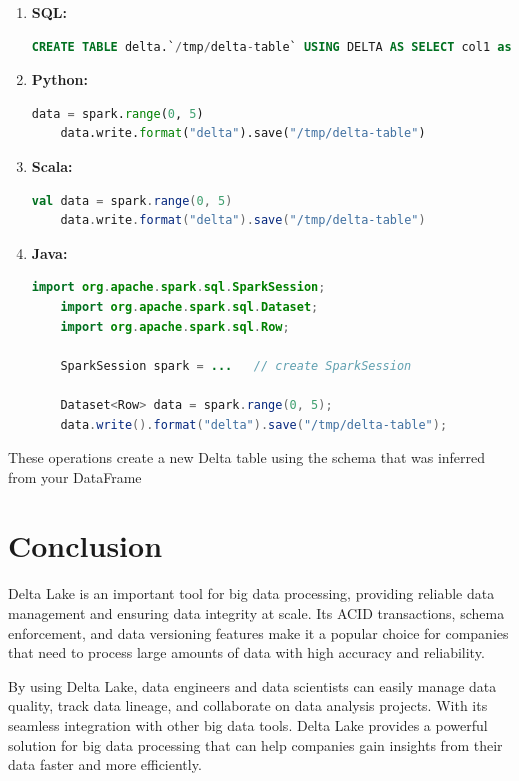 \begin{enumerate}
    \item \textbf{SQL:}
    \begin{lstlisting}[language=sql]
    CREATE TABLE delta.`/tmp/delta-table` USING DELTA AS SELECT col1 as id FROM VALUES 0,1,2,3,4;
    \end{lstlisting}
    \item \textbf{Python:}
    \begin{lstlisting}[language=python]
    data = spark.range(0, 5)
    data.write.format("delta").save("/tmp/delta-table")
    \end{lstlisting}
    \item \textbf{Scala:}
    \begin{lstlisting}[language=scala]
    val data = spark.range(0, 5)
    data.write.format("delta").save("/tmp/delta-table")
    \end{lstlisting}
    \item \textbf{Java:}
    \begin{lstlisting}[language=java]
    import org.apache.spark.sql.SparkSession;
    import org.apache.spark.sql.Dataset;
    import org.apache.spark.sql.Row;
    
    SparkSession spark = ...   // create SparkSession
    
    Dataset<Row> data = spark.range(0, 5);
    data.write().format("delta").save("/tmp/delta-table");
    \end{lstlisting}
\end{enumerate}

These operations create a new Delta table using the schema that was inferred from your DataFrame

\section*{Conclusion}

Delta Lake is an important tool for big data processing, providing reliable data management and ensuring data integrity at scale. Its ACID transactions, schema enforcement, and data versioning features make it a popular choice for companies that need to process large amounts of data with high accuracy and reliability.

By using Delta Lake, data engineers and data scientists can easily manage data quality, track data lineage, and collaborate on data analysis projects. With its seamless integration with other big data tools. Delta Lake provides a powerful solution for big data processing that can help companies gain insights from their data faster and more efficiently.

